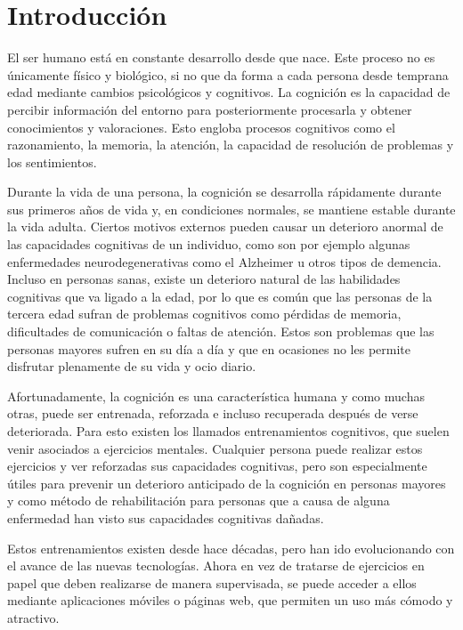 

\label{chp:Introduccion}
\minitoc

\section{Introducción}


El ser humano está en constante desarrollo desde que nace. Este proceso no es únicamente físico y biológico, si no que da forma a cada persona desde temprana edad mediante cambios psicológicos y cognitivos. La cognición es la capacidad de percibir información del entorno para posteriormente procesarla y obtener conocimientos y valoraciones. Esto engloba procesos cognitivos como el razonamiento, la memoria, la atención, la capacidad de resolución de problemas y los sentimientos.

 Durante la vida de una persona, la cognición se desarrolla rápidamente durante sus primeros años de vida y, en condiciones normales, se mantiene estable durante la vida adulta. Ciertos motivos externos pueden causar un deterioro anormal de las capacidades cognitivas de un individuo, como son por ejemplo algunas enfermedades neurodegenerativas como el Alzheimer u otros tipos de demencia. Incluso en personas sanas, existe un deterioro natural de las habilidades cognitivas que va ligado a la edad, por lo que es común que las personas de la tercera edad sufran de problemas cognitivos como pérdidas de memoria, dificultades de comunicación o faltas de atención. Estos son problemas que las personas mayores sufren en su día a día y que en ocasiones no les permite disfrutar plenamente de su vida y ocio diario.
 
Afortunadamente, la cognición es una característica humana y como muchas otras, puede ser entrenada, reforzada e incluso recuperada después de verse deteriorada. Para esto existen los llamados entrenamientos cognitivos, que suelen venir asociados a ejercicios mentales. Cualquier persona puede realizar estos ejercicios y ver reforzadas sus capacidades cognitivas, pero son especialmente útiles para prevenir un deterioro anticipado de la cognición en personas mayores y como método de rehabilitación para personas que a causa de alguna enfermedad han visto sus capacidades cognitivas dañadas.

Estos entrenamientos existen desde hace décadas, pero han ido evolucionando con el avance de las nuevas tecnologías. Ahora en vez de tratarse de ejercicios en papel que deben realizarse de manera supervisada, se puede acceder a ellos mediante aplicaciones móviles o páginas web, que permiten un uso más cómodo y atractivo.

